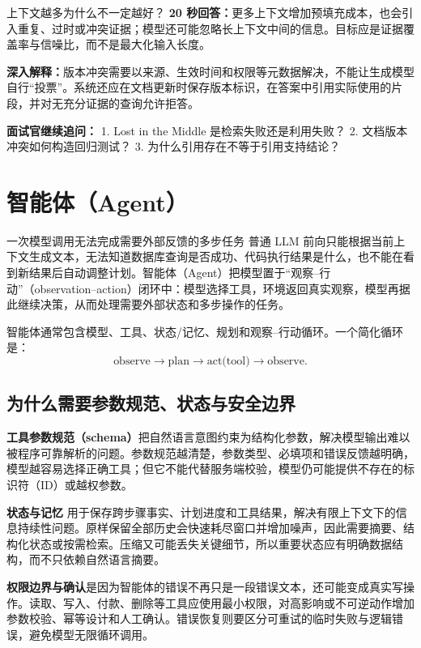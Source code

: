 \begin{interviewbox}{上下文越多为什么不一定越好？}
\textbf{20 秒回答：}更多上下文增加预填充成本，也会引入重复、过时或冲突证据；模型还可能忽略长上下文中间的信息。目标应是证据覆盖率与信噪比，而不是最大化输入长度。

\textbf{深入解释：}版本冲突需要以来源、生效时间和权限等元数据解决，不能让生成模型自行“投票”。系统还应在文档更新时保存版本标识，在答案中引用实际使用的片段，并对无充分证据的查询允许拒答。

\textbf{面试官继续追问：}
1. Lost in the Middle 是检索失败还是利用失败？
2. 文档版本冲突如何构造回归测试？
3. 为什么引用存在不等于引用支持结论？
\end{interviewbox}

\chapter{智能体（Agent）}\label{sec:agents}

\begin{motivationbox}{一次模型调用无法完成需要外部反馈的多步任务}
普通 LLM 前向只能根据当前上下文生成文本，无法知道数据库查询是否成功、代码执行结果是什么，也不能在看到新结果后自动调整计划。智能体（Agent）把模型置于“观察--行动”（observation--action）闭环中：模型选择工具，环境返回真实观察，模型再据此继续决策，从而处理需要外部状态和多步操作的任务。
\end{motivationbox}

智能体通常包含模型、工具、状态/记忆、规划和观察--行动循环。一个简化循环是：
\[
\text{observe}\rightarrow\text{plan}\rightarrow\text{act(tool)}\rightarrow\text{observe}.
\]
\section{为什么需要参数规范、状态与安全边界}

\textbf{工具参数规范（schema）}把自然语言意图约束为结构化参数，解决模型输出难以被程序可靠解析的问题。参数规范越清楚，参数类型、必填项和错误反馈越明确，模型越容易选择正确工具；但它不能代替服务端校验，模型仍可能提供不存在的标识符（ID）或越权参数。

\textbf{状态与记忆} 用于保存跨步骤事实、计划进度和工具结果，解决有限上下文下的信息持续性问题。原样保留全部历史会快速耗尽窗口并增加噪声，因此需要摘要、结构化状态或按需检索。压缩又可能丢失关键细节，所以重要状态应有明确数据结构，而不只依赖自然语言摘要。

\textbf{权限边界与确认}是因为智能体的错误不再只是一段错误文本，还可能变成真实写操作。读取、写入、付款、删除等工具应使用最小权限，对高影响或不可逆动作增加参数校验、幂等设计和人工确认。错误恢复则要区分可重试的临时失败与逻辑错误，避免模型无限循环调用。

